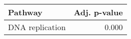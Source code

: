 \begin{tabular}{lr}
\toprule
         Pathway &  Adj. p-value \\
\midrule
 DNA replication &         0.000 \\
\bottomrule
\end{tabular}
